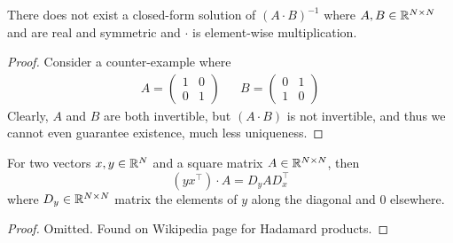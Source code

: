 
\begin{lemma} \label{elementwise-ruins-everything}
    There does not exist a closed-form solution of $(A \cdot B)^{-1}$ where 
    $A, B \in {\mathbb R}^{N \times N}$ and are real and symmetric and $\cdot$ is element-wise multiplication. 
    \begin{proof}
        Consider a counter-example where
        \begin{align*}
            A = \begin{pmatrix}
                1 & 0\\
                0 & 1
            \end{pmatrix} && B = \begin{pmatrix}
                0 & 1\\
                1 & 0
            \end{pmatrix}
        \end{align*}
        Clearly, $A$ and $B$ are both invertible, but $(A \cdot B)$ is not invertible, 
        and thus we cannot even guarantee existence, much less uniqueness.
    \end{proof}
\end{lemma}
    
\begin{lemma} \label{outer-prod-elementwise-trick}
    For two vectors $x, y \in {\mathbb R}^N$ and a square matrix $A \in {\mathbb R}^{N \times N}$, then 
    \[(yx^\top) \cdot A = D_y A D_x^\top\]
    where $D_y \in {\mathbb R}^{N \times N}$ matrix the elements of $y$ along the diagonal and $0$ elsewhere. 

    \begin{proof}
        Omitted. Found on Wikipedia page for Hadamard products.
    \end{proof}
\end{lemma}

